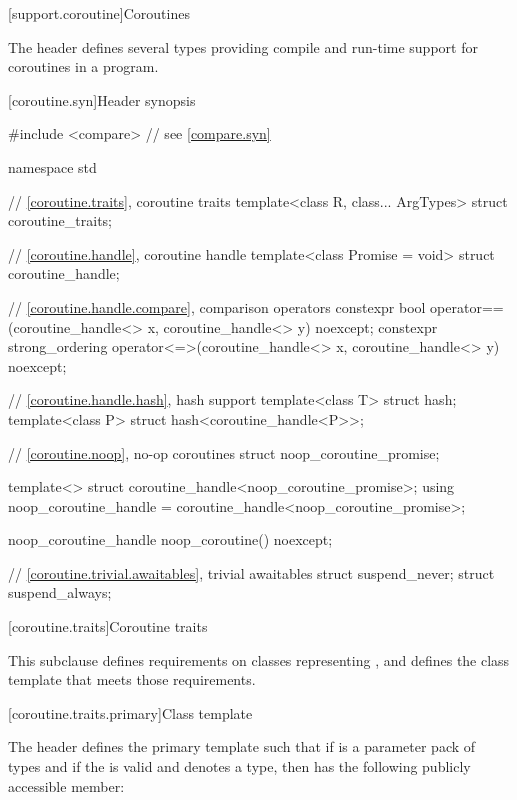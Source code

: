 [support.coroutine]{Coroutines}

\pnum
The header 
defines several types providing
compile and run-time support for
coroutines in a \Cpp{} program.

[coroutine.syn]{Header  synopsis}

%
%
\begin{codeblock}
#include <compare>              // see \ref{compare.syn}

namespace std {
  // \ref{coroutine.traits}, coroutine traits
  template<class R, class... ArgTypes>
    struct coroutine_traits;

  // \ref{coroutine.handle}, coroutine handle
  template<class Promise = void>
    struct coroutine_handle;

  // \ref{coroutine.handle.compare}, comparison operators
  constexpr bool operator==(coroutine_handle<> x, coroutine_handle<> y) noexcept;
  constexpr strong_ordering operator<=>(coroutine_handle<> x, coroutine_handle<> y) noexcept;

  // \ref{coroutine.handle.hash}, hash support
  template<class T> struct hash;
  template<class P> struct hash<coroutine_handle<P>>;

  // \ref{coroutine.noop}, no-op coroutines
  struct noop_coroutine_promise;

  template<> struct coroutine_handle<noop_coroutine_promise>;
  using noop_coroutine_handle = coroutine_handle<noop_coroutine_promise>;

  noop_coroutine_handle noop_coroutine() noexcept;

  // \ref{coroutine.trivial.awaitables}, trivial awaitables
  struct suspend_never;
  struct suspend_always;
}
\end{codeblock}

[coroutine.traits]{Coroutine traits}

\pnum
This subclause defines requirements on classes representing
,
and defines the class template
that meets those requirements.

[coroutine.traits.primary]{Class template }

\pnum
The header  defines the primary template
 such that
if  is a parameter pack of types and
if the   is valid and
denotes a type,
then  has the following publicly
accessible member:

